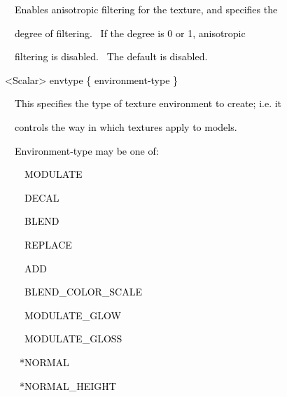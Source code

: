 \documentclass[a4paper]{article}
\newcommand\textstyleOOoComputerKeyWord[1]{\textrm{\textcolor[rgb]{0.0,0.0,0.5019608}{#1}}}
\begin{document}
\bigskip

{\color{black}
\textstyleOOoComputerKeyWord{\textcolor{black}{\ \ \ \ Enables anisotropic filtering for the texture, and specifies
the}}}

{\color{black}
\textstyleOOoComputerKeyWord{\textcolor{black}{\ \ \ \ degree of filtering. \ If the degree is 0 or 1, anisotropic}}}

{\color{black}
\textstyleOOoComputerKeyWord{\textcolor{black}{\ \ \ \ filtering is disabled. \ The default is disabled.}}}

\clearpage
\bigskip


\bigskip

{\color{black}
\textstyleOOoComputerKeyWord{\textcolor{black}{\ \ {\textless}Scalar{\textgreater} envtype \{ environment-type \}}}}


\bigskip

{\color{black}
\textstyleOOoComputerKeyWord{\textcolor{black}{\ \ \ \ This specifies the type of texture environment to create; i.e.
it}}}

{\color{black}
\textstyleOOoComputerKeyWord{\textcolor{black}{\ \ \ \ controls the way in which textures apply to models.}}}

{\color{black}
\textstyleOOoComputerKeyWord{\textcolor{black}{\ \ \ \ Environment-type may be one of:}}}


\bigskip

{\color{black}
\textstyleOOoComputerKeyWord{\textcolor{black}{\ \ \ \ \ \ MODULATE}}}

{\color{black}
\textstyleOOoComputerKeyWord{\textcolor{black}{\ \ \ \ \ \ DECAL}}}

{\color{black}
\textstyleOOoComputerKeyWord{\textcolor{black}{\ \ \ \ \ \ BLEND}}}

{\color{black}
\textstyleOOoComputerKeyWord{\textcolor{black}{\ \ \ \ \ \ REPLACE}}}

{\color{black}
\textstyleOOoComputerKeyWord{\textcolor{black}{\ \ \ \ \ \ ADD}}}

{\color{black}
\textstyleOOoComputerKeyWord{\textcolor{black}{\ \ \ \ \ \ BLEND\_COLOR\_SCALE}}}

{\color{black}
\textstyleOOoComputerKeyWord{\textcolor{black}{\ \ \ \ \ \ MODULATE\_GLOW}}}

{\color{black}
\textstyleOOoComputerKeyWord{\textcolor{black}{\ \ \ \ \ \ MODULATE\_GLOSS}}}

{\color{black}
\textstyleOOoComputerKeyWord{\textcolor{black}{\ \ \ \ \ *NORMAL}}}

{\color{black}
\textstyleOOoComputerKeyWord{\textcolor{black}{\ \ \ \ \ *NORMAL\_HEIGHT}}}
\end{document}
